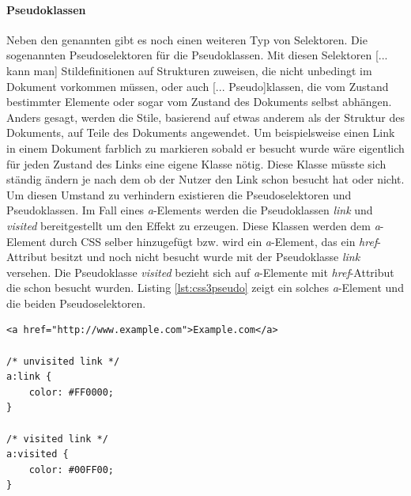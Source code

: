 \documentclass[12pt,a4paper,bibliography=totocnumbered,listof=totocnumbered]{scrartcl}
\begin{document}
\paragraph{Pseudoklassen} Neben den genannten gibt es noch einen weiteren Typ von Selektoren. Die sogenannten Pseudoselektoren für die Pseudoklassen. \glqq Mit diesen Selektoren [... kann man] Stildefinitionen auf Strukturen zuweisen, die nicht unbedingt im Dokument vorkommen müssen, oder auch [... Pseudo]klassen, die vom Zustand bestimmter Elemente oder sogar vom Zustand des Dokuments selbst abhängen. Anders gesagt, werden die Stile, basierend auf etwas anderem als der Struktur des Dokuments, auf Teile des Dokuments angewendet.\grqq{}\cite[S.53ff]{MeyeCasc2005} Um beispielsweise einen Link in einem Dokument farblich zu markieren sobald er besucht wurde wäre eigentlich für jeden Zustand des Links eine eigene Klasse nötig. Diese Klasse müsste sich ständig ändern je nach dem ob der Nutzer den Link schon besucht hat oder nicht. Um diesen Umstand zu verhindern existieren die Pseudoselektoren und Pseudoklassen. Im Fall eines \textit{a}-Elements werden die Pseudoklassen \textit{link} und \textit{visited} bereitgestellt um den Effekt zu erzeugen. Diese Klassen werden dem \textit{a}-Element durch CSS selber hinzugefügt bzw. wird ein \textit{a}-Element, das ein \textit{href}-Attribut besitzt und noch nicht besucht wurde mit der Pseudoklasse \textit{link} versehen. Die Pseudoklasse \textit{visited} bezieht sich auf \textit{a}-Elemente mit \textit{href}-Attribut die schon besucht wurden. Listing \ref{lst:css3pseudo} zeigt ein solches \textit{a}-Element und die beiden Pseudoselektoren.

	\vspace{1em}
	\begin{lstlisting}[caption=CSS3 Pseudoklassen und -selektoren, label=lst:css3pseudo]
<a href="http://www.example.com">Example.com</a>

/* unvisited link */
a:link {
    color: #FF0000;
}

/* visited link */
a:visited {
    color: #00FF00;
}
	\end{lstlisting}
\end{document}
